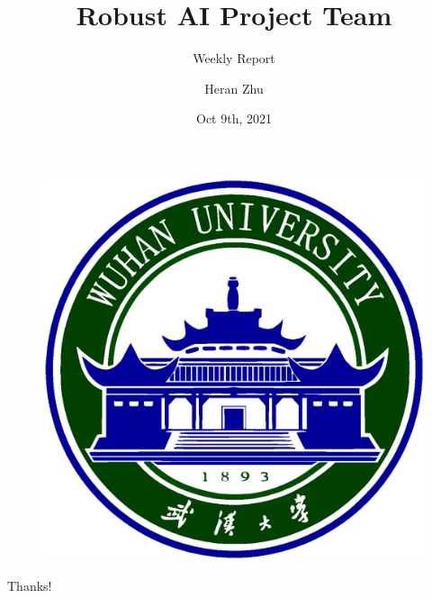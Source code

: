 \documentclass[aspectratio=169]{beamer}
\author{Heran Zhu}
\title{Robust AI Project Team}
\subtitle{Weekly Report}
\institute{Electronic Information School, Wuhan University}
\date{Oct 9th, 2021}
\begin{document}
\kaishu
\begin{frame}
	\titlepage
	\begin{figure}[htb]
		\begin{center}
			\includegraphics[width=0.1\linewidth]{pic/whulogo.eps}
		\end{center}
	\end{figure}
\end{frame}




% 
% 
% 
% 
% 
% 
% 
% 


% 
% 
% 
% 




% 	
% 	

\begin{frame}
    \begin{center}
        {\Huge Thanks!}
    \end{center}
\end{frame}
\end{document}
